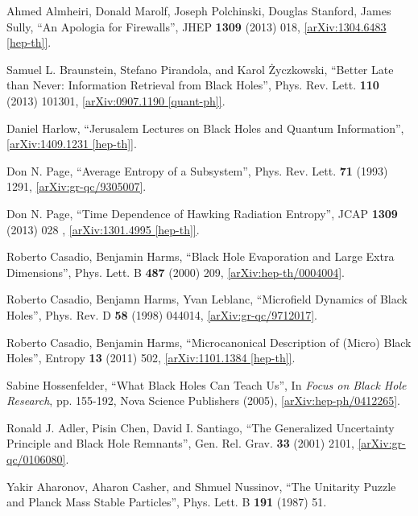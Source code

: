 \documentclass[12pt]{article}
\newcommand{\2}{$^2$}
\newcommand{\3}{$^3$}
\newcommand{\4}{$_4$}
\newcommand{\5}{$_5$}
\begin{document}
\begin{thebibliography}{400}
Ahmed Almheiri, Donald Marolf, Joseph Polchinski, Douglas Stanford, James Sully,
``An Apologia for Firewalls'', JHEP \textbf{1309} (2013) 018, \href{http://arxiv.org/abs/1304.6483}{[arXiv:1304.6483 [hep-th]]}.

Samuel L. Braunstein, Stefano Pirandola, and Karol \.Zyczkowski, ``Better Late than Never: Information Retrieval from Black Holes'', Phys. Rev. Lett. \textbf{110} (2013) 101301, \href{http://arxiv.org/abs/0907.1190}{[arXiv:0907.1190 [quant-ph]]}.

Daniel Harlow, ``Jerusalem Lectures on Black Holes and Quantum Information'',
\href{http://arxiv.org/abs/1409.1231}{[arXiv:1409.1231 [hep-th]]}.

Don N. Page, ``Average Entropy of a Subsystem'', Phys. Rev. Lett. \textbf{71} (1993) 1291, \href{http://arxiv.org/abs/gr-qc/9305007}{[arXiv:gr-qc/9305007]}.

Don N. Page, ``Time Dependence of Hawking Radiation Entropy'', JCAP \textbf{1309} (2013) 028 , \href{http://arxiv.org/abs/1301.4995}{[arXiv:1301.4995 [hep-th]]}.

Roberto Casadio, Benjamin Harms, ``Black Hole Evaporation and Large Extra Dimensions'', Phys. Lett. B \textbf{487} (2000) 209, \href{http://arxiv.org/abs/hep-th/0004004}{[arXiv:hep-th/0004004]}.

Roberto Casadio, Benjamn Harms, Yvan Leblanc, ``Microfield Dynamics of Black Holes'', Phys. Rev. D \textbf{58} (1998) 044014, \href{http://arxiv.org/abs/gr-qc/9712017}{[arXiv:gr-qc/9712017]}.

Roberto Casadio, Benjamin Harms, ``Microcanonical Description of (Micro) Black Holes'', Entropy \textbf{13} (2011) 502, \href{http://arxiv.org/abs/1101.1384}{[arXiv:1101.1384 [hep-th]]}.

Sabine Hossenfelder, ``What Black Holes Can Teach Us'', In \emph{Focus on Black Hole Research}, pp. 155-192, Nova Science Publishers (2005), \href{http://arxiv.org/abs/hep-ph/0412265}{[arXiv:hep-ph/0412265]}.

Ronald J. Adler, Pisin Chen, David I. Santiago, ``The Generalized Uncertainty Principle and Black Hole Remnants'', 	Gen. Rel. Grav. \textbf{33} (2001) 2101, \href{http://arxiv.org/abs/gr-qc/0106080}{[arXiv:gr-qc/0106080]}.


Yakir Aharonov, Aharon Casher, and Shmuel Nussinov, ``The Unitarity Puzzle and Planck Mass Stable Particles'', Phys. Lett. B \textbf{191} (1987) 51.



\end{thebibliography}
\end{document}

